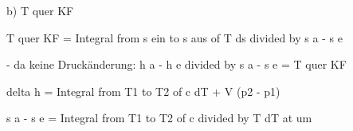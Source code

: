b) T quer KF

T quer KF = Integral from s ein to s aus of T ds divided by s a - s e

- da keine Druckänderung: h a - h e divided by s a - s e = T quer KF

delta h = Integral from T1 to T2 of c dT + V (p2 - p1)

s a - s e = Integral from T1 to T2 of c divided by T dT at um